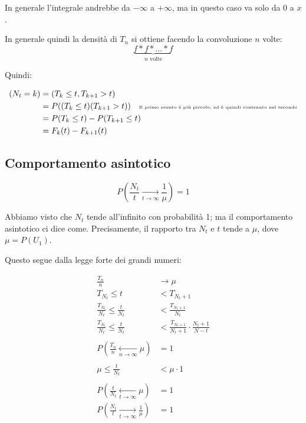 \documentclass[a4paper,12pt]{book}
\begin{document}
In generale l'integrale andrebbe da $ -\infty $ a $ +\infty $, ma in questo caso va solo da 0 a $ x $.

In generale quindi la densità di $ T_n $ si ottiene facendo la convoluzione $ n $ volte:
$$ \underbrace{f*f*...*f}_{n \text{ volte}}$$

Quindi:

\begin{align*}
	(N_t = k) & = (T_k \le t, T_{k+1} > t) \\
	& = P((T_k \le t) (T_{k+1} > t) ) \quad \text{\tiny{Il primo evento è più piccolo, ed è quindi contenuto nel secondo}} \\
	& = P(T_k \le t) - P(T_{k+1} \le t) \\
	& = F_k(t) - F_{k+1}(t)
\end{align*}

\subsection{Comportamento asintotico}

$$ P(\frac{N_t}{t} \underset{t \to \infty}{\longrightarrow} \frac{1}{\mu}) = 1 $$
	
Abbiamo visto che $ N_t $ tende all'infinito con probabilità 1; ma il comportamento asintotico ci dice come. Precisamente, il rapporto tra $ N_t $ e $ t $ tende a $ \mu $, dove $ \mu= P(U_1) $.

Questo segue dalla legge forte dei grandi numeri:

\begin{align*}
	\frac{T_n}{n} & \to \mu \\
	T_{N_t} \le t & < T_{N_t + 1} \\
	\frac{T_{N_t}}{N_t} \le \frac{t}{N_t} & < \frac{T_{N_t + 1}}{N_t} \\
	\frac{T_{N_t}}{N_t} \le \frac{t}{N_t} & < \frac{T_{N_t + 1}}{N_t + 1} \cdot \frac{N_t + 1}{N-t} \\
	\\
	P(\frac{T_n}{n} \underset{n \to \infty}{\longleftarrow} \mu) & = 1 \\
	\\
	\mu \le \frac{t}{N_t} & < \mu \cdot 1 \\
	\\
	P(\frac{t}{N_t} \underset{t \to \infty}{\longleftarrow} \mu) & = 1  \\
	P(\frac{N_t}{t} \underset{t \to \infty}{\longrightarrow} \frac{1}{\mu}) & = 1
\end{align*}
\end{document}
